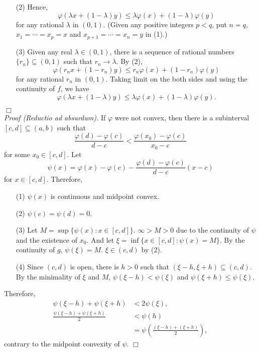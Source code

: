 \documentclass{article}
\begin{document}
\begin{enumerate}
\item[(2)]
  Hence,
  $$\varphi(\lambda x + (1 - \lambda) y) \leq \lambda \varphi(x) + (1 - \lambda) \varphi(y)$$
  for any rational $\lambda$ in $(0,1)$.
  (Given any positive integers $p < q$,
  put $n = q$,
  $x_1 = \cdots = x_p = x$
  and $x_{p+1} = \cdots = x_n = y$ in (1).)
  \item[(3)]
  Given any real $\lambda \in (0,1)$,
  there is a sequence of rational numbers $\{r_n\} \subseteq (0, 1)$
  such that $r_n \to \lambda$.
  By (2),
  $$\varphi(r_n x + (1 - r_n) y) \leq r_n \varphi(x) + (1 - r_n) \varphi(y)$$
  for any rational $r_n$ in $(0,1)$.
  Taking limit on the both sides and using the continuity of $f$,
  we have
  $$\varphi(\lambda x + (1 - \lambda) y) \leq \lambda \varphi(x) + (1 - \lambda) \varphi(y).$$
\end{enumerate}
$\Box$ \\



\emph{Proof (Reductio ad absurdum).}
If $\varphi$ were not convex,
then there is a subinterval $[c,d] \subseteq (a,b)$
such that
$$\frac{\varphi(d)-\varphi(c)}{d-c} < \frac{\varphi(x_0)-\varphi(c)}{x_0-c}$$
for some $x_0 \in [c, d]$.
Let
$$\psi(x) = \varphi(x)-\varphi(c) - \frac{\varphi(d)-\varphi(c)}{d-c}(x - c)$$
for $x \in [c,d]$.
Therefore,
\begin{enumerate}
\item[(1)]
  $\psi(x)$ is continuous and midpoint convex.

\item[(2)]
  $\psi(c) = \psi(d) = 0$.

\item[(3)]
  Let $M = \sup\{\psi(x) : x \in [c,d]\}$.
  $\infty > M > 0$ due to the continuity of $\psi$ and the existence of $x_0$.
  And let $\xi = \inf \{ x \in [c,d] : \psi(x) = M \}$.
  By the continuity of $g$, $\psi(\xi) = M$.
  $\xi \in (c,d)$ by (2).

\item[(4)]
  Since $(c,d)$ is open, there is $h > 0$ such that $(\xi-h,\xi+h) \subseteq (c,d)$.
  By the minimality of $\xi$ and $M$, $\psi(\xi-h) < \psi(\xi)$ and $\psi(\xi+h) \leq \psi(\xi)$.
\end{enumerate}
Therefore,
\begin{align*}
\psi(\xi-h) + \psi(\xi+h)
&< 2 \psi(\xi), \\
\frac{\psi(\xi-h) + \psi(\xi+h)}{2}
&< \psi(h) \\
&= \psi\left( \frac{(\xi-h) + (\xi+h)}{2} \right),
\end{align*}
contrary to the midpoint convexity of $\psi$.
$\Box$ \\\\



\end{document}
